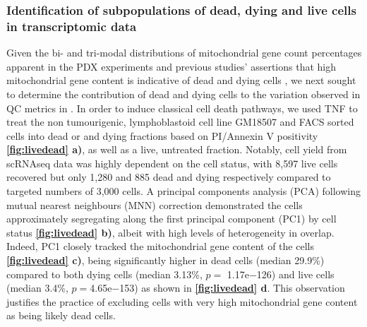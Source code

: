  \subsubsection{Identification of subpopulations of dead, dying and live cells in transcriptomic data}
Given the bi- and tri-modal distributions of mitochondrial gene count percentages \cite{o2019dissociation} apparent in the PDX experiments and previous studies' assertions that high mitochondrial gene content is indicative of dead and dying cells \cite{ilicic2016classification, zhao2002mitochondrial}, we next sought to determine the contribution of dead and dying cells to the variation observed in QC metrics in \cite{o2019dissociation}. In order to induce classical cell death pathways, we used TNF\textalpha   
 \cite{carswell1975endotoxin, sedger2014tnf} to treat the non tumourigenic, lymphoblastoid cell line GM18507 and FACS sorted cells into dead or and dying fractions based on PI/Annexin V positivity \textbf{\autoref{fig:livedead} a)}, as well as a live, untreated fraction. Notably, cell yield from scRNAseq data was highly dependent on the cell status, with 8,597 live cells recovered but only 1,280 and 885 dead and dying respectively compared to targeted numbers of 3,000 cells. 
A principal components analysis (PCA) following mutual nearest neighbours (MNN) correction \cite{haghverdi2018batch} demonstrated the cells approximately segregating along the first principal component (PC1) by cell status \textbf{\autoref{fig:livedead} b)}, albeit with high levels of heterogeneity in overlap. Indeed, PC1 closely tracked the mitochondrial gene content of the cells \textbf{\autoref{fig:livedead} c)}, being significantly higher in dead cells (median 29.9\%) compared to both dying cells (median 3.13\%, $p=$ 1.17e−126) and live cells (median 3.4\%, $p=$4.65e−153) as shown in \textbf{\autoref{fig:livedead} d}.
This observation justifies the practice of excluding cells with very high mitochondrial gene content as being likely dead cells.

